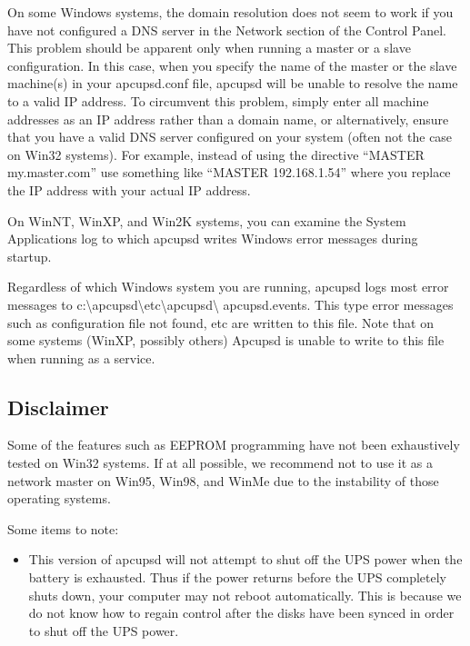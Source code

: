 {{{{{{{\label{index-Problems_002c-Windows-178}
\label{index-Windows_002c-Problems-179}
On some Windows systems, the domain resolution does not seem to work if you
have not configured a DNS server in the Network section of the Control Panel.
This problem should be apparent only when running a master or a slave
configuration. In this case, when you specify the name of the master or the
slave machine(s) in your apcupsd.conf file, apcupsd will be unable to resolve
the name to a valid IP address. To circumvent this problem, simply enter all
machine addresses as an IP address rather than a domain name, or
alternatively, ensure that you have a valid DNS server configured on your
system (often not the case on Win32 systems).  For example, instead of using
the directive ``MASTER my.master.com'' use something like ``MASTER
192.168.1.54'' where you replace the IP address with your actual IP address.  

On WinNT, WinXP, and Win2K systems, you can examine the System Applications
log to which apcupsd writes Windows error messages during startup.  

Regardless of which Windows system you are running, apcupsd logs most error
messages to
c:\textbackslash{}apcupsd\textbackslash{}etc\textbackslash{}apcupsd\textbackslash
{}apcupsd.events. This type error messages such as configuration file not
found, etc are written to this file. Note that on some systems (WinXP, possibly
others) Apcupsd is unable to write to this file when running as a service.


\label{Disclaimer}

\subsection*{Disclaimer}

\label{index-Disclaimer-180}
Some of the features such as EEPROM programming have not been exhaustively
tested on Win32 systems. If at all possible, we recommend not to use it as a
network master on Win95, Win98, and WinMe due to the instability of those
operating systems.  

Some items to note:  

\begin{itemize}
\item This version of apcupsd will not attempt to shut off the UPS power when
   the battery is exhausted. Thus if the power returns before the UPS completely
   shuts down, your computer may not reboot automatically. This is because we do
not know how to regain control after the disks have been synced in order to
shut off the UPS power.  


\end{itemize}}}}}}}}
